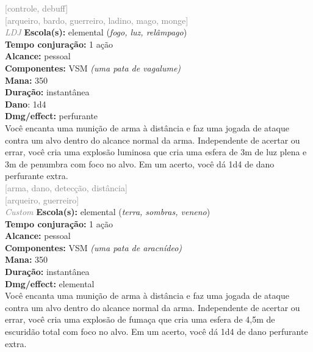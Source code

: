 \documentclass{RPG_Adventure}[2021/10/20]
\begin{document}
{\scriptsize \textcolor{gray}{[controle, debuff]\\}}
{\scriptsize \textcolor{gray}{[arqueiro, bardo, guerreiro, ladino, mago, monge]\\}}
{\tiny \textcolor{gray}{\textit{LDJ}}}
{\small \t \textbf{Escola(s):} elemental (\textit{fogo, luz, relâmpago})\\\t \textbf{Tempo conjuração:} 1 ação\\\t \textbf{Alcance:} pessoal\\\t \textbf{Componentes:} VSM \textit{(uma pata de vagalume)}\\\t \textbf{Mana:} 350\\\t \textbf{Duração:} instantânea\\\t \textbf{Dano}: 1d4\\\t \textbf{Dmg/effect:} perfurante\\}
{\normalsize Você encanta uma munição de arma à distância e faz uma jogada de ataque contra um alvo dentro do alcance normal da arma. Independente de acertar ou errar, você cria uma explosão luminosa que cria uma esfera de 3m de luz plena e 3m de penumbra com foco no alvo. Em um acerto, você dá 1d4 de dano perfurante extra.\\}
{\scriptsize \textcolor{gray}{[arma, dano, detecção, distância]\\}}
{\scriptsize \textcolor{gray}{[arqueiro, guerreiro]\\}}
{\tiny \textcolor{gray}{\textit{Custom}}}
{\small \t \textbf{Escola(s):} elemental (\textit{terra, sombras, veneno})\\\t \textbf{Tempo conjuração:} 1 ação\\\t \textbf{Alcance:} pessoal\\\t \textbf{Componentes:} VSM \textit{(uma pata de aracnídeo)}\\\t \textbf{Mana:} 350\\\t \textbf{Duração:} instantânea\\\t \textbf{Dmg/effect:} elemental\\}
{\normalsize Você encanta uma munição de arma à distância e faz uma jogada de ataque contra um alvo dentro do alcance normal da arma. Independente de acertar ou errar, você cria uma explosão de fumaça que cria uma esfera de 4,5m de escuridão total com foco no alvo. Em um acerto, você dá 1d4 de dano perfurante extra.\\}
\end{document}
